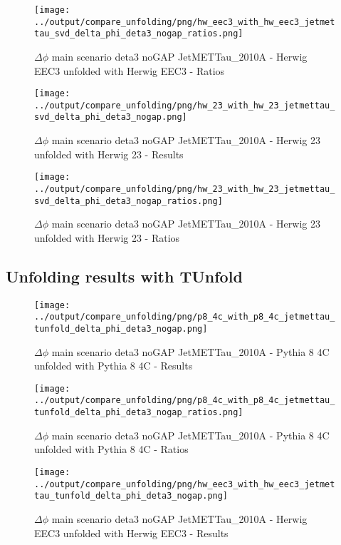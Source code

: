 \documentclass[11pt]{book}
\begin{document}
\begin{figure}[ht]
\centering
\texttt{[image: ../output/compare\_unfolding/png/hw\_eec3\_with\_hw\_eec3\_jetmettau\_svd\_delta\_phi\_deta3\_nogap\_ratios.png]}
\caption{$\Delta\phi$ main scenario deta3 noGAP JetMETTau\_2010A - Herwig EEC3 unfolded with Herwig EEC3 - Ratios}
\label{hw_eec3_hw_eec3_jetmettau_svd_delta_phi_deta3_nogap_b}
\end{figure}

\begin{figure}[ht]
\centering
\texttt{[image: ../output/compare\_unfolding/png/hw\_23\_with\_hw\_23\_jetmettau\_svd\_delta\_phi\_deta3\_nogap.png]}
\caption{$\Delta\phi$ main scenario deta3 noGAP JetMETTau\_2010A - Herwig 23 unfolded with Herwig 23 - Results}
\label{hw_23_hw_23_jetmettau_svd_delta_phi_deta3_nogap_a}
\end{figure}

\begin{figure}[ht]
\centering
\texttt{[image: ../output/compare\_unfolding/png/hw\_23\_with\_hw\_23\_jetmettau\_svd\_delta\_phi\_deta3\_nogap\_ratios.png]}
\caption{$\Delta\phi$ main scenario deta3 noGAP JetMETTau\_2010A - Herwig 23 unfolded with Herwig 23 - Ratios}
\label{hw_23_hw_23_jetmettau_svd_delta_phi_deta3_nogap_b}
\end{figure}


\clearpage
\subsection{Unfolding results with TUnfold}

\begin{figure}[ht]
\centering
\texttt{[image: ../output/compare\_unfolding/png/p8\_4c\_with\_p8\_4c\_jetmettau\_tunfold\_delta\_phi\_deta3\_nogap.png]}
\caption{$\Delta\phi$ main scenario deta3 noGAP JetMETTau\_2010A - Pythia 8 4C unfolded with Pythia 8 4C - Results}
\label{p8_p8_jetmettau_tunfold_delta_phi_deta3_nogap_a}
\end{figure}

\begin{figure}[ht]
\centering
\texttt{[image: ../output/compare\_unfolding/png/p8\_4c\_with\_p8\_4c\_jetmettau\_tunfold\_delta\_phi\_deta3\_nogap\_ratios.png]}
\caption{$\Delta\phi$ main scenario deta3 noGAP JetMETTau\_2010A - Pythia 8 4C unfolded with Pythia 8 4C - Ratios}
\label{p8_p8_jetmettau_tunfold_delta_phi_deta3_nogap_b}
\end{figure}

\begin{figure}[ht]
\centering
\texttt{[image: ../output/compare\_unfolding/png/hw\_eec3\_with\_hw\_eec3\_jetmettau\_tunfold\_delta\_phi\_deta3\_nogap.png]}
\caption{$\Delta\phi$ main scenario deta3 noGAP JetMETTau\_2010A - Herwig EEC3 unfolded with Herwig EEC3 - Results}
\label{hw_eec3_hw_eec3_jetmettau_tunfold_delta_phi_deta3_nogap_a}
\end{figure}
\end{document}
